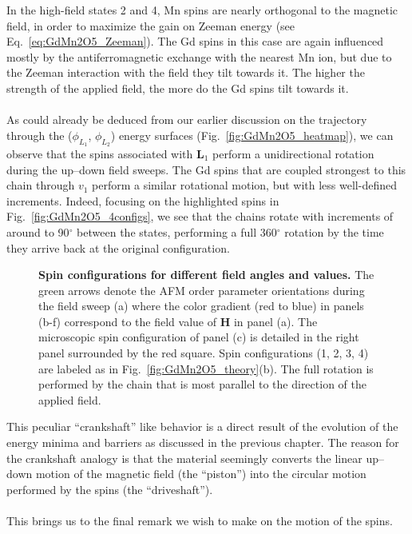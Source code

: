 In the high-field states 2 and 4, Mn spins are nearly orthogonal to the magnetic field, in order to maximize the gain on Zeeman energy (see Eq.~\eqref{eq:GdMn2O5_Zeeman}).
The Gd spins in this case are again influenced mostly by the antiferromagnetic exchange with the nearest Mn ion, but due to the Zeeman interaction with the field they tilt towards it.
The higher the strength of the applied field, the more do the Gd spins tilt towards it.
\\\\
As could already be deduced from our earlier discussion on the trajectory through the ($\phi_{L_1}$, $\phi_{L_2}$) energy surfaces (Fig.~\ref{fig:GdMn2O5_heatmap}), we can observe that the spins associated with $\bm L_1$ perform a unidirectional rotation during the up--down field sweeps.
The Gd spins that are coupled strongest to this chain through $v_1$ perform a similar rotational motion, but with less well-defined increments.
Indeed, focusing on the highlighted spins in Fig.~\ref{fig:GdMn2O5_4configs}, we see that the chains rotate with increments of around to 90$^\circ$ between the states, performing a full 360$^\circ$ rotation by the time they arrive back at the original configuration.
\begin{figure}[h]
	\caption{{\bf Spin configurations for different field angles and values.} The green arrows denote the AFM order parameter orientations during the field sweep (a) where the color gradient (red to blue) in panels (b-f) correspond to the field value of $\bm{H}$ in panel (a). The microscopic spin configuration of panel (c) is detailed in the right panel surrounded by the red square. Spin configurations (1, 2, 3, 4) are labeled as in Fig.~\ref{fig:GdMn2O5_theory}(b). The full rotation is performed by the chain that is most parallel to the direction of the applied field. \label{fig:GdMn2O5_regimes}}  
\end{figure}
This peculiar ``crankshaft'' like behavior is a direct result of the evolution of the energy minima and barriers as discussed in the previous chapter.
The reason for the crankshaft analogy is that the material seemingly converts the linear up--down motion of the magnetic field (the ``piston'') into the circular motion performed by the spins (the ``driveshaft'').
\\\\
This brings us to the final remark we wish to make on the motion of the spins.
